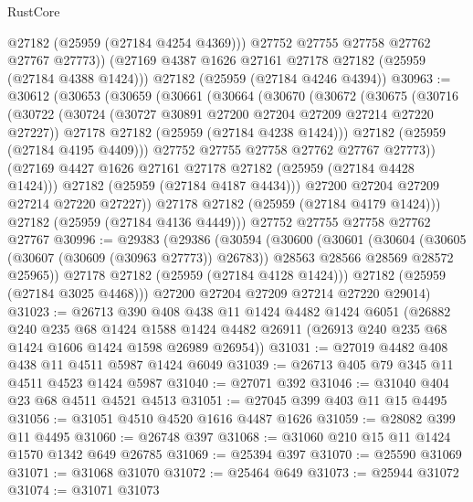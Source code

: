 \begin{lexlean}{RustCore}
\begin{coremodule}
          @27182
          (@25959 (@27184 @4254 @4369)))
        @27752
        @27755
        @27758
        @27762
        @27767
        @27773))
    (@27169 @4387 @1626 @27161 @27178 @27182 (@25959 (@27184 @4388 @1424)))
    @27182
    (@25959 (@27184 @4246 @4394))
@30963 := @30612
    (@30653
      (@30659
        (@30661
          (@30664
            (@30670
              (@30672
                (@30675
                  (@30716
                    (@30722
                      (@30724 (@30727 @30891 @27200 @27204 @27209 @27214 @27220 @27227))
                      @27178
                      @27182
                      (@25959 (@27184 @4238 @1424)))
                    @27182
                    (@25959 (@27184 @4195 @4409)))
                  @27752
                  @27755
                  @27758
                  @27762
                  @27767
                  @27773))
              (@27169 @4427 @1626 @27161 @27178 @27182 (@25959 (@27184 @4428 @1424)))
              @27182
              (@25959 (@27184 @4187 @4434)))
            @27200
            @27204
            @27209
            @27214
            @27220
            @27227))
        @27178
        @27182
        (@25959 (@27184 @4179 @1424)))
      @27182
      (@25959 (@27184 @4136 @4449)))
    @27752
    @27755
    @27758
    @27762
    @27767
@30996 := @29383
    (@29386
      (@30594
        (@30600
          (@30601
            (@30604
              (@30605 (@30607 (@30609 (@30963 @27773)) @26783))
              @28563
              @28566
              @28569
              @28572
              @25965))
          @27178
          @27182
          (@25959 (@27184 @4128 @1424)))
        @27182
        (@25959 (@27184 @3025 @4468)))
      @27200
      @27204
      @27209
      @27214
      @27220
      @29014)
@31023 := @26713
    @390
    @408
    @438
    @11
    @1424
    @4482
    @1424
    @6051
    (@26882
      @240
      @235
      @68
      @1424
      @1588
      @1424
      @4482
      @26911
      (@26913 @240 @235 @68 @1424 @1606 @1424 @1598 @26989 @26954))
@31031 := @27019 @4482 @408 @438 @11 @4511 @5987 @1424 @6049
@31039 := @26713 @405 @79 @345 @11 @4511 @4523 @1424 @5987
@31040 := @27071 @392
@31046 := @31040 @404 @23 @68 @4511 @4521 @4513
@31051 := @27045 @399 @403 @11 @15 @4495
@31056 := @31051 @4510 @4520 @1616 @4487 @1626
@31059 := @28082 @399 @11 @4495
@31060 := @26748 @397
@31068 := @31060 @210 @15 @11 @1424 @1570 @1342 @649 @26785
@31069 := @25394 @397
@31070 := @25590 @31069
@31071 := @31068 @31070
@31072 := @25464 @649
@31073 := @25944 @31072
@31074 := @31071 @31073

\end{coremodule}
\end{lexlean}
